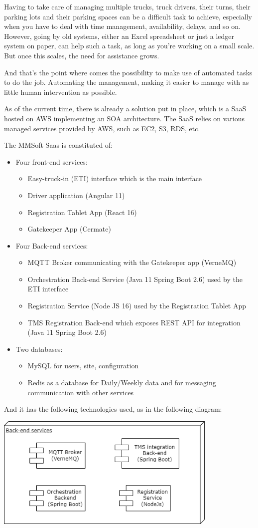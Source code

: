 Having to take care of managing multiple trucks, truck drivers, their turns, their parking lots
and their parking spaces can be a difficult task to achieve, especially when you have to deal with
time management, availability, delays, and so on.
However, going by old systems, either an Excel spreadsheet or just a ledger system on
paper, can help such a task, as long as you're working on a small scale. But once
this scales, the need for assistance grows.

And that's the point where comes the possibility to make use of automated tasks to do the job.
Automating the management, making it easier to manage with as little human intervention
as possible.

As of the current time, there is already a solution put in place, which is a SaaS hosted
on AWS implementing an SOA architecture. The SaaS relies on various managed services
provided by AWS, such as EC2, S3, RDS, etc.

The MMSoft Saas is constituted of:
\begin{itemize}
    \item Four front-end services:
    \begin{itemize}
        \item Easy-truck-in (ETI) interface which is the main interface
        \item Driver application (Angular 11)
        \item Registration Tablet App (React 16)
        \item Gatekeeper App (Cermate)
    \end{itemize}
    \item Four Back-end services:
    \begin{itemize}
        \item MQTT Broker communicating with the Gatekeeper app (VerneMQ)
        \item Orchestration Back-end Service (Java 11 Spring Boot 2.6) used by the ETI interface
        \item Registration Service (Node JS 16) used by the Registration Tablet App
        \item TMS Registration Back-end which exposes REST API for integration (Java 11 Spring Boot 2.6)
    \end{itemize}
    \item Two databases:
    \begin{itemize}
        \item MySQL for users, site, configuration
        \item Redis as a database for Daily/Weekly data and for messaging communication with other services
    \end{itemize}
\end{itemize}

And it has the following technologies used, as in the following diagram:

\begin{center}
    \includegraphics[width=0.8\textwidth]{images/Backend}
\end{center}
